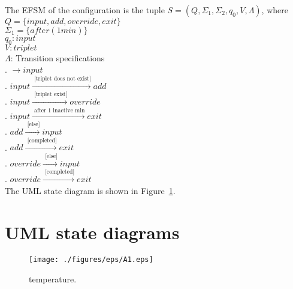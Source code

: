\documentclass[12pt]{article}
\begin{document}
\begin{spacing}{1.5}
\noindent The EFSM of the configuration is the tuple $S = (Q, \Sigma_1, \Sigma_2, q_0, V, \Lambda)$, where\\
\noindent $Q = \{input, add, override, exit\}$\\
\noindent $\Sigma_1 = \{after(1 min)\}$\\
\noindent $q_0: input$\\
\noindent $V: triplet$\\
\noindent $\Lambda$: Transition specifications\\
. $\rightarrow input$\\
. $input \xrightarrow {\text { [triplet does not exist]}} add$\\
. $input \xrightarrow {\text { [triplet exist]}} override$\\
. $input \xrightarrow {\text { after 1 inactive min}} exit$\\
. $add \xrightarrow {\text { [else]}} input$\\
. $add \xrightarrow {\text { [completed]}} exit$\\
. $override \xrightarrow {\text { [else]}} input$\\
. $override \xrightarrow {\text { [completed]}} exit$\\

\noindent The UML state diagram is shown in Figure~\ref{fig:temperature-fig}.

\newpage

\section{UML state diagrams}

\begin{figure}[h!]
	\centering
		\texttt{[image: ./figures/eps/A1.eps]}
		  \caption{temperature.}
  \label{fig:temperature-fig}
\end{figure}

\end{spacing}
\end{document}
